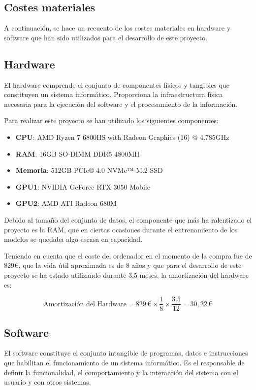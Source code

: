 \subsection{Costes materiales}
A continuación, se hace un recuento de los costes materiales en hardware y software que han sido utilizados para el desarrollo de este proyecto.
\subsection*{Hardware}
El hardware comprende el conjunto de componentes físicos y tangibles que constituyen un sistema informático. Proporciona la infraestructura física necesaria para la ejecución del software y el procesamiento de la información.

Para realizar este proyecto se han utilizado los siguientes componentes:
\begin{itemize}
\item \textbf{CPU}: AMD Ryzen 7 6800HS with Radeon Graphics (16) @ 4.785GHz
\item \textbf{RAM}: 16GB SO-DIMM DDR5 4800MH
\item \textbf{Memoria}: 512GB PCIe® 4.0 NVMe™ M.2 SSD
\item \textbf{GPU1}: NVIDIA GeForce RTX 3050 Mobile 
\item \textbf{GPU2}: AMD ATI Radeon 680M
\end{itemize}

Debido al tamaño del conjunto de datos, el componente que más ha ralentizado el proyecto es la RAM, que en ciertas ocasiones durante el entrenamiento de los modelos se quedaba algo escasa en capacidad.

Teniendo en cuenta que el coste del ordenador en el momento de la compra fue de 829€, que la vida útil aproximada es de 8 años y que para el desarrollo de este proyecto se ha estado utilizando durante 3,5 meses, la amortización del hardware es:

\begin{equation}
	\text{Amortización del Hardware} = 829\,\euro \times \frac{1}{8} \times \frac{3.5}{12} = 30,22\,\text{€}
\end{equation}

\subsection*{Software}
El software constituye el conjunto intangible de programas, datos e instrucciones que habilitan el funcionamiento de un sistema informático. Es el responsable de definir la funcionalidad, el comportamiento y la interacción del sistema con el usuario y con otros sistemas. 

